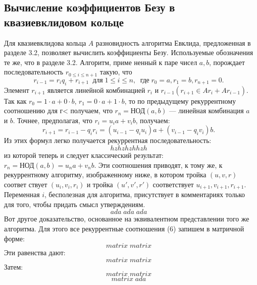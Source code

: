 \documentclass{mai_book}
\begin{document}
\subsection{Вычисление коэффициентов Безу
в квазиевклидовом кольце}
Для квазиевклидова кольца $A$ разновидность алгоритма Евклида, пред­ложенная в разделе 3.2, позволяет вычислить коэффициенты Безу. Ис­пользуемые обозначения те же, что в разделе 3.2. Алгоритм, приме­
ненный к паре чисел $a,b$, порождает последовательность $r_{0\leqslant i\leqslant n+1}$ такую, что
$$r_{i-1}=r_{i}q_{i}+r_{i+1}\;\;\text{для}\;1\leqslant i\leqslant n,\;\;\text{где}\;r_{0}=a,r_{1}=b,r_{n+1}=0.$$
Элемент $r_{i+1}$ является линейной комбинацией $r_{i}$ и $r_{i-1} (r_{i+1}\in Ar_{i}+Ar_{i-1})$. Так как $r_{0}=1\cdot a+0\cdot b$, $r_{1}=0\cdot a+1\cdot b$, то по предыдущему
рекуррентному соотношению для г< получаем, что $r_{n} = \text{НОД}(a,b)$ — линейная комбинация $a$ и $b$. Точнее, предполагая, что $r_{i}=u_{i}a+v_{i}b$, получаем:
$$r_{i+1}=r_{i-1}-q_{i}r_{i}=(u_{i-1}-q_{i}u_{i})a+(v_{i-1}-q_{i}v_{i})b.$$
\newpage
Из этих формул легко получается рекуррентная последовательность:
$$hzhzhzhhzh$$
из которой теперь и следует классический результат: $r_{n} = \text{НОД}(a, b) =
u_{n}a+v_{n}b$. Эти соотношения приводят, к тому же, к рекуррентному
алгоритму, изображенному ниже, в котором тройка $(u,v,r)$ соответ­
ствует $(u_{i}, v_{i}, r_{i})$ и тройка $(u', v', r')$ соответствует $u_{i+1},v_{i+1},r_{i+1}$. Переменная $i$, бесполезная для алгоритма, присутствует в комментариях
только для того, чтобы придать смысл утверждениям.
$$ada\;ada\;ada$$
Вот другое доказательство, основанное на эквивалентном предста­влении того же алгоритма. Для этого все рекуррентные соотноше­ния (6) запишем в матричной форме:
$$matrix\;matrix$$
Эти равенства дают:
$$matrix\;matrix$$
Затем:
$$matrix\;matrix$$
\newpage
$$matrix\;ada$$
\end{document}
